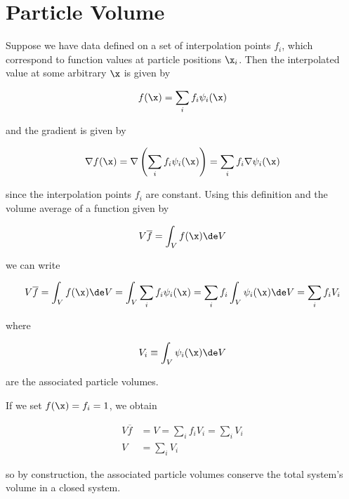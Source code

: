 \section{Particle Volume}\label{chap:particle-volume}


Suppose we have data defined on a set of interpolation points $f_i$, which correspond to function
values at particle positions $\x_i$. Then the interpolated value at some arbitrary $\x$ is given by

\begin{align}
    f(\x) = \sum_i f_i \psi_i(\x) \label{eq:psi-interpolation}
\end{align}

and the gradient is given by

\begin{align}
    \nabla f(\x) = \nabla \left( \sum_i f_i \psi_i(\x) \right) = \sum_i f_i \nabla \psi_i(\x)
\end{align}

since the interpolation points $f_i$ are constant. Using this definition and the volume average of
a function given by

\begin{align}
    V \overline{f} = \int_V f(\x) \de V
\end{align}

we can write

\begin{align}
    V \overline{f}
        = \int_V f(\x) \de V
        = \int_V  \sum_i f_i \psi_i(\x)
        = \sum_i f_i \int_V \psi_i(\x) \de V
        = \sum_i f_i V_i
\end{align}

where

\begin{align}
    V_i \equiv \int_V \psi_i(\x) \de V \label{eq:psi-integral-volume}
\end{align}

are the associated particle volumes.

If we set $f(\x) = f_i = 1$, we obtain

\begin{align}
    V \overline{f} &= V = \sum_i f_i V_i = \sum_i V_i \\
    V &= \sum_i V_i
\end{align}

so by construction, the associated particle volumes conserve the total system's volume in a closed
system.

